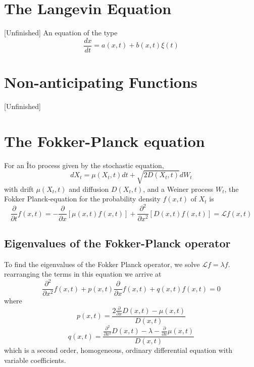 \documentclass[12pt]{book}
\begin{document}
\section{The Langevin Equation}\label{section:theLangevinEquation}
[Unfinished]
An equation of the type 
\begin{equation*}
	\frac{dx}{dt}=a(x,t)+b(x,t)\xi(t)
\end{equation*}



\section{Non-anticipating Functions}
{[Unfinished]}

\section{The Fokker-Planck equation}\label{section:theFokkerPlanckEquation}
For an \^{I}to process given by the stochastic equation, 
\begin{equation*}
dX_t=\mu(X_t,t)dt+\sqrt{2D(X_t,t)}dW_t
\end{equation*}
with drift $\mu(X_t,t)$ and diffusion $D(X_t,t)$, and a Weiner process $W_t$, the Fokker Planck-equation for the probability density $f(x,t)$ of $X_t$ is 
\begin{equation*}
\frac{\partial}{\partial t}f(x,t)=-\frac{\partial}{\partial x}[\mu(x,t)f(x,t)]+\frac{\partial^2}{\partial x^2}[D(x,t)f(x,t)]=\mathcal{L}f(x,t)
\end{equation*}
\subsection{Eigenvalues of the Fokker-Planck operator }\label{subsection:eigenvaluesOfTheFokkerPlanckOperator}
To find the eigenvalues of the Fokker Planck operator, we solve $\mathcal{L}f = \lambda f$.
rearranging the terms in this equation we arrive at 
\begin{equation*}
\frac{\partial^2}{\partial x^2}f(x,t) +p(x,t)\frac{\partial}{\partial x}f(x,t) +q(x,t)f(x,t) = 0
\end{equation*}
where 
\begin{equation*}
p(x,t) = \frac{2\frac{\partial}{\partial x}D(x,t)-\mu(x,t)}{D(x,t)}
\end{equation*}
\begin{equation*}
q(x,t)=\frac{\frac{\partial^2}{\partial x^2}D(x,t)-\lambda-\frac{\partial}{\partial x}\mu(x,t)}{D(x,t)}
\end{equation*}
which is a second order, homogeneous, ordinary differential equation with variable coefficients. 
\end{document}
